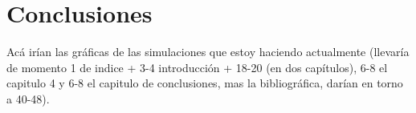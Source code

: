 \newpage
\thispagestyle{empty}
\mbox{}

\chapter{Conclusiones}
\label{ch:chapter5}


Acá irían las gráficas de las simulaciones que estoy haciendo actualmente (llevaría de momento 1 de indice + 3-4 introducción + 18-20 (en dos capítulos), 6-8 el capitulo 4 y 6-8 el capitulo de conclusiones, mas la bibliográfica, darían en torno a 40-48).